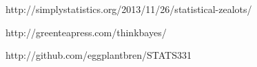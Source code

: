 \documentclass[a4paper, 12pt]{article}
\begin{document}
\begin{thebibliography}{999} %
http://simplystatistics.org/2013/11/26/statistical-zealots/

http://greenteapress.com/thinkbayes/

http://github.com/eggplantbren/STATS331

\end{thebibliography}
\end{document}
